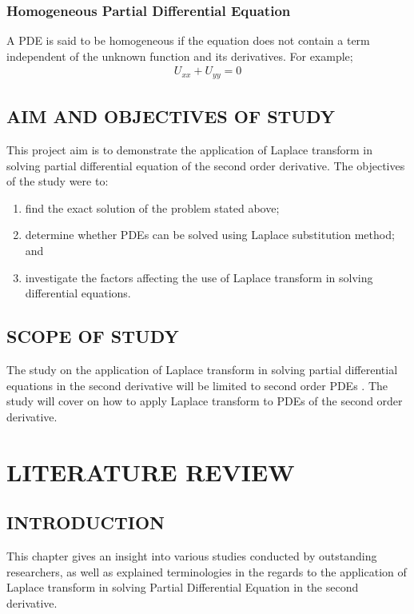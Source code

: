 \documentclass[11pt]{report}
\newcommand{\PDe}{Partial Differential Equation }
\newcommand{\PDEs}{PDEs }
\begin{document}
	\subsection{Homogeneous Partial Differential Equation}
	A PDE is said to be homogeneous if the equation does not contain a term independent of the unknown function and its derivatives. For example;
	\begin{eqnarray}
		U_{xx} + U_{yy} = 0\label{eq:3_8}
	\end{eqnarray}

	\section{AIM AND OBJECTIVES OF STUDY}
	This project aim is to demonstrate the application of Laplace transform in solving partial differential equation of the second order derivative. The objectives of the study were to:
	\begin{enumerate}
		\renewcommand{\labelenumi}{\roman{enumi}.}
		\item find the exact solution of the problem stated above;
		\item determine whether \PDEs can be solved using Laplace substitution method; and
		\item investigate the factors affecting the use of Laplace transform in solving differential equations.
	\end{enumerate}

	\section{SCOPE OF STUDY}
	The study on the application of Laplace transform in solving partial differential equations in the second derivative will be limited to second order \PDEs. The study will cover on how to apply Laplace transform to \PDEs of the second order derivative. 
	
	
	\chapter{LITERATURE REVIEW}
	\section{INTRODUCTION}
	This chapter gives an insight into various studies conducted by outstanding researchers, as well as explained terminologies in the regards to the application of Laplace transform in solving \PDe in the second derivative.\\
	
\end{document}
